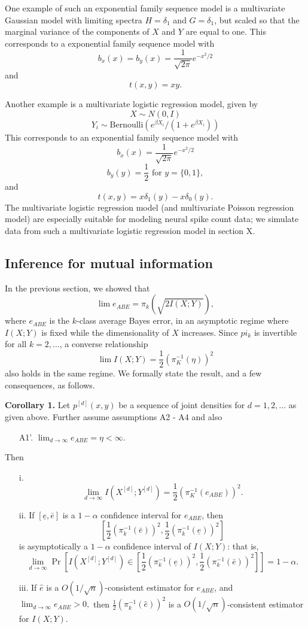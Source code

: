 \documentclass[12pt]{article}
\begin{document}
One example of such an exponential family sequence model is a multivariate Gaussian model with limiting spectra $H = \delta_1$ and $G = \delta_1$, but scaled so that the marginal variance of the components of $X$ and $Y$ are equal to one.  This corresponds to a exponential family sequence model with
\[
b_x(x) = b_y(x) = \frac{1}{\sqrt{2\pi}} e^{-x^2/2}
\]
and
\[t(x, y) = xy.\]

Another example is a multivariate logistic regression model,
given by
\[
X \sim N(0, I)
\]
\[
Y_i \sim \text{Bernoulli}(e^{\beta X_i}/(1 + e^{\beta X_i}))
\]
This corresponds to an exponential family sequence model with
\[
b_x(x) = \frac{1}{\sqrt{2\pi}} e^{-x^2/2}
\]
\[
b_y(y) = \frac{1}{2}\text{ for }y = \{0, 1\},
\]
and
\[
t(x, y) = x\delta_1(y) - x\delta_0(y).
\]
The multivariate logistic regression model (and multivariate Poisson regression model)
are especially suitable for modeling neural spike count data;
we simulate data from such a multivariate logistic regression model in section X.

\subsection{Inference for mutual information}

In the previous section, we showed that
\[
\lim e_{ABE} = \pi_k(\sqrt{2 I(X; Y)}),
\]
where $e_{ABE}$ is the $k$-class average Bayes error,
in an asymptotic regime where $I(X; Y)$ is fixed while the dimensionality of $X$ increases.
Since $pi_k$ is invertible for all $k = 2, \hdots$,
a converse relationship
\[
\lim I(X; Y) = \frac{1}{2}(\pi_K^{-1}(\eta))^2
\]
also holds in the same regime.  We formally state the result, and a few consequences, as follows.

\textbf{Corollary 1.}
Let $p^{[d]}(x, y)$ be a sequence of joint densities
for $d = 1,2,\hdots$ as given above.  Further assume assumptions A2 - A4 and also
\begin{itemize}
\item[A1'.] $\lim_{d \to \infty} e_{ABE} = \eta < \infty.$
\end{itemize}
Then
\begin{itemize}
\item[i.]
\[
\lim_{d \to \infty} I(X^{[d]}; Y^{[d]}) = \frac{1}{2}(\pi_K^{-1}(e_{ABE}))^2.
\]
\item[ii.]
If $[\underline{e}, \bar{e}]$ is a $1-\alpha$ confidence interval for $e_{ABE}$,
then
\[
[\frac{1}{2}(\pi_k^{-1}(\bar{e}))^2, \frac{1}{2}(\pi_k^{-1}(\underline{e}))^2]
\]
is asymptotically a $1-\alpha$ confidence interval of $I(X; Y)$: that is,
\[
\lim_{d \to \infty} \Pr\left[I(X^{[d]}; Y^{[d]}) \in [\frac{1}{2}(\pi_k^{-1}(\underline{e}))^2, \frac{1}{2}(\pi_k^{-1}(\bar{e}))^2]\right] = 1-\alpha.
\]
\item[iii.] If $\hat{e}$ is a $O(1/\sqrt{n})$-consistent estimator for $e_{ABE}$,
and $\lim_{d \to \infty} e_{ABE} > 0,$
then $\frac{1}{2}(\pi_k^{-1}(\hat{e}))^2$ is a $O(1/\sqrt{n})$-consistent estimator for $I(X; Y)$.
\end{itemize}
\end{document}
